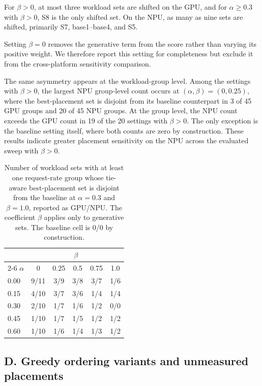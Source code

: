 \documentclass{article}
\begin{document}
For $\beta{>}0$, at most three workload sets are shifted on the GPU, and for $\alpha{\ge}0.3$ with $\beta{>}0$, S8 is the only shifted set. On the NPU, as many as nine sets are shifted, primarily S7, base1--base4, and S5.

Setting $\beta{=}0$ removes the generative term from the score rather than varying its positive weight. We therefore report this setting for completeness but exclude it from the cross-platform sensitivity comparison.

The same asymmetry appears at the workload-group level. Among the settings with $\beta{>}0$, the largest NPU group-level count occurs at $(\alpha,\beta){=}(0,0.25)$, where the best-placement set is disjoint from its baseline counterpart in 3 of 45 GPU groups and 20 of 45 NPU groups. At the group level, the NPU count exceeds the GPU count in 19 of the 20 settings with $\beta{>}0$. The only exception is the baseline setting itself, where both counts are zero by construction. These results indicate greater placement sensitivity on the NPU across the evaluated sweep with $\beta{>}0$.

\begin{table}[h]
\centering
\caption{Number of workload sets with at least one request-rate group whose tie-aware best-placement set is disjoint from the baseline at $\alpha{=}0.3$ and $\beta{=}1.0$, reported as GPU/NPU. The coefficient $\beta$ applies only to generative sets. The baseline cell is 0/0 by construction.}
\label{tab:app_sweep}
\footnotesize
\setlength{\tabcolsep}{6pt}
\begin{tabular}{@{}l ccccc@{}}
\toprule
& \multicolumn{5}{c}{$\beta$} \\
\cmidrule(lr){2-6}
$\alpha$ & 0 & 0.25 & 0.5 & 0.75 & 1.0 \\
\midrule
0.00 & 9/11 & 3/9 & 3/8 & 3/7 & 1/6 \\
0.15 & 4/10 & 3/7 & 3/6 & 1/4 & 1/4 \\
0.30 & 2/10 & 1/7 & 1/6 & 1/2 & 0/0 \\
0.45 & 1/10 & 1/7 & 1/5 & 1/2 & 1/2 \\
0.60 & 1/10 & 1/6 & 1/4 & 1/3 & 1/2 \\
\bottomrule
\end{tabular}
\end{table}



\subsection*{D. Greedy ordering variants and unmeasured placements}
\end{document}
